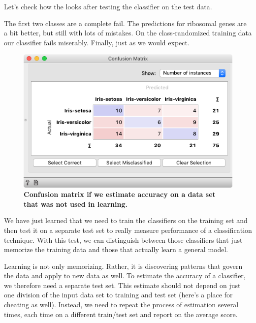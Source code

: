 Let’s check how the  looks after testing the classifier on the test data.

The first two classes are a complete fail. The predictions for ribosomal genes are a bit better, but still with lots of mistakes. On the class-randomized training data our classifier fails miserably. Finally, just as we would expect.

\begin{figure}[h]
    \includegraphics[scale=0.4]{confusion_sampler.png}
    \caption{\textbf{\textsf{Confusion matrix if we estimate accuracy on a data set that was not used in learning.}}}
\end{figure}

We have just learned that we need to train the classifiers on the training set and then test it on a separate test set to really measure performance of a classification technique. With this test, we can distinguish between those classifiers that just memorize the training data and those that actually learn a general model.

Learning is not only memorizing. Rather, it is discovering patterns that govern the data and apply to new data as well. To estimate the accuracy of a classifier, we therefore need a separate test set. This estimate should not depend on just one division of the input data set to training and test set (here's a place for cheating as well). Instead, we need to repeat the process of estimation several times, each time on a different train/test set and report on the average score.